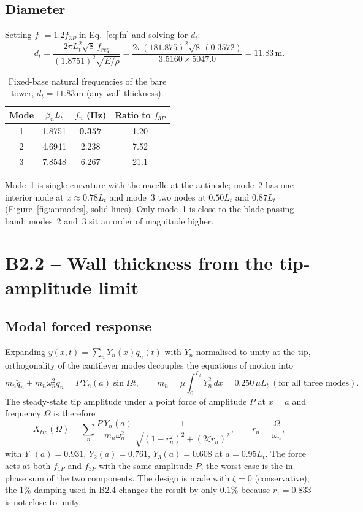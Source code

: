 \documentclass[11pt,a4paper]{article}
\begin{document}
\subsection*{Diameter}
Setting $f_1=1.2f_{3P}$ in Eq.~\eqref{eq:fn} and solving for $d_t$:
\[
d_t=\frac{2\pi L_t^2\sqrt{8}\,f_{req}}{(1.8751)^2\sqrt{E/\rho}}
=\frac{2\pi(181.875)^2\sqrt 8\,(0.3572)}{3.5160\times 5047.0}
=\mathbf{11.83\,\mathrm{m}} .
\]
\begin{table}[H]
\centering
\caption{Fixed-base natural frequencies of the bare tower, $d_t=11.83\,\mathrm{m}$ (any wall thickness).}
\begin{tabular}{@{}cccc@{}}
\toprule
Mode & $\beta_nL_t$ & $f_n$ (Hz) & Ratio to $f_{3P}$ \\
\midrule
1 & 1.8751 & \textbf{0.357} & 1.20 \\
2 & 4.6941 & 2.238 & 7.52 \\
3 & 7.8548 & 6.267 & 21.1 \\
\bottomrule
\end{tabular}
\end{table}
Mode~1 is single-curvature with the nacelle at the antinode; mode~2 has one interior node at $x\approx0.78L_t$ and mode~3 two nodes at $0.50L_t$ and $0.87L_t$ (Figure~\ref{fig:anmodes}, solid lines). Only mode~1 is close to the blade-passing band; modes~2 and~3 sit an order of magnitude higher.

\section{B2.2 -- Wall thickness from the tip-amplitude limit}\label{sec:b22}
\subsection*{Modal forced response}
Expanding $y(x,t)=\sum_n Y_n(x)q_n(t)$ with $Y_n$ normalised to unity at the tip, orthogonality of the cantilever modes decouples the equations of motion into
\[
m_n\ddot q_n+m_n\omega_n^2q_n=P\,Y_n(a)\sin\Omega t,\qquad
m_n=\mu\!\int_0^{L_t}\!Y_n^2\,dx=0.250\,\mu L_t \ (\text{for all three modes}).
\]
The steady-state tip amplitude under a point force of amplitude $P$ at $x=a$ and frequency $\Omega$ is therefore
\begin{equation}
X_{tip}(\Omega)=\sum_n\frac{P\,Y_n(a)}{m_n\omega_n^2}\,\frac{1}{\sqrt{(1-r_n^2)^2+(2\zeta r_n)^2}},\qquad r_n=\frac{\Omega}{\omega_n},
\label{eq:forced}
\end{equation}
with $Y_1(a)=0.931$, $Y_2(a)=0.761$, $Y_3(a)=0.608$ at $a=0.95L_t$. The force acts at both $f_{1P}$ and $f_{3P}$ with the same amplitude $P$; the worst case is the in-phase sum of the two components. The design is made with $\zeta=0$ (conservative); the $1\%$ damping used in B2.4 changes the result by only $0.1\%$ because $r_1=0.833$ is not close to unity.
\end{document}

